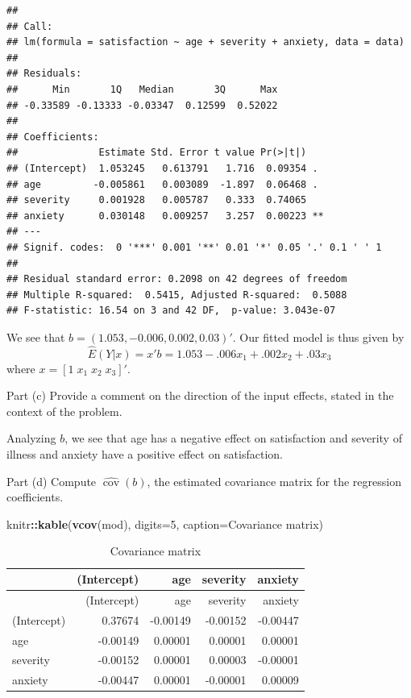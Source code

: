\documentclass[
]{article}
\newenvironment{Shaded}{\begin{snugshade}}{\end{snugshade}}
\newcommand{\AttributeTok}[1]{\textcolor[rgb]{0.13,0.29,0.53}{#1}}
\newcommand{\DecValTok}[1]{\textcolor[rgb]{0.00,0.00,0.81}{#1}}
\newcommand{\FunctionTok}[1]{\textcolor[rgb]{0.13,0.29,0.53}{\textbf{#1}}}
\newcommand{\NormalTok}[1]{#1}
\newcommand{\SpecialCharTok}[1]{\textcolor[rgb]{0.81,0.36,0.00}{\textbf{#1}}}
\newcommand{\StringTok}[1]{\textcolor[rgb]{0.31,0.60,0.02}{#1}}
\begin{document}
\begin{verbatim}
## 
## Call:
## lm(formula = satisfaction ~ age + severity + anxiety, data = data)
## 
## Residuals:
##      Min       1Q   Median       3Q      Max 
## -0.33589 -0.13333 -0.03347  0.12599  0.52022 
## 
## Coefficients:
##              Estimate Std. Error t value Pr(>|t|)   
## (Intercept)  1.053245   0.613791   1.716  0.09354 . 
## age         -0.005861   0.003089  -1.897  0.06468 . 
## severity     0.001928   0.005787   0.333  0.74065   
## anxiety      0.030148   0.009257   3.257  0.00223 **
## ---
## Signif. codes:  0 '***' 0.001 '**' 0.01 '*' 0.05 '.' 0.1 ' ' 1
## 
## Residual standard error: 0.2098 on 42 degrees of freedom
## Multiple R-squared:  0.5415, Adjusted R-squared:  0.5088 
## F-statistic: 16.54 on 3 and 42 DF,  p-value: 3.043e-07
\end{verbatim}

We see that \(b = (1.053, -0.006, 0.002, 0.03)'\). Our fitted model is
thus given by \[
  \hat{E}(Y|x) = x'b = 1.053 - .006 x_1 + .002 x_2 + .03 x_3
\] where \(x = [1\;x_1\;x_2\;x_3]'\).

\begin{tcolorbox}[split=\f]
Part (c)
\tcblower
Provide a comment on the direction of the input effects, stated in the context
of the problem.
\end{tcolorbox}

Analyzing \(b\), we see that age has a negative effect on satisfaction
and severity of illness and anxiety have a positive effect on
satisfaction.

\begin{tcolorbox}[split=\f]
Part (d)
\tcblower
Compute $\widehat{\operatorname{cov}}(b)$, the estimated covariance matrix for the regression
coefficients.
\end{tcolorbox}

\begin{Shaded}
\begin{Highlighting}[]
\NormalTok{knitr}\SpecialCharTok{::}\FunctionTok{kable}\NormalTok{(}\FunctionTok{vcov}\NormalTok{(mod), }\AttributeTok{digits=}\DecValTok{5}\NormalTok{, }\AttributeTok{caption=}\StringTok{\textquotesingle{}Covariance matrix\textquotesingle{}}\NormalTok{)}
\end{Highlighting}
\end{Shaded}

\begin{longtable}[]{@{}lrrrr@{}}
\caption{Covariance matrix}\tabularnewline
\toprule\noalign{}
& (Intercept) & age & severity & anxiety \\
\midrule\noalign{}
\endfirsthead
\toprule\noalign{}
& (Intercept) & age & severity & anxiety \\
\midrule\noalign{}
\endhead
\bottomrule\noalign{}
\endlastfoot
(Intercept) & 0.37674 & -0.00149 & -0.00152 & -0.00447 \\
age & -0.00149 & 0.00001 & 0.00001 & 0.00001 \\
severity & -0.00152 & 0.00001 & 0.00003 & -0.00001 \\
anxiety & -0.00447 & 0.00001 & -0.00001 & 0.00009 \\
\end{longtable}
\end{document}
